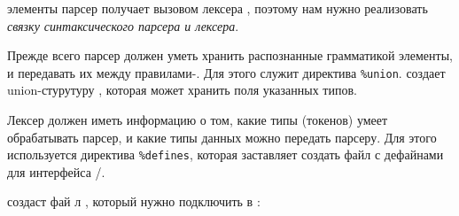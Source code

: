 
 элементы парсер получает вызовом лексера ,
поэтому нам нужно реализовать \emph{связку синтаксического парсера и лексера}.

Прежде всего парсер должен уметь хранить распознанные грамматикой элементы, и
передавать их между правилами-. Для этого служит директива
\verb|%union|.  создает union-стурутуру , которая
может хранить поля указанных типов.

Лексер должен иметь информацию о том, какие типы  (токенов)
умеет обрабатывать парсер, и какие типы данных можно передать парсеру. Для
этого используется директива \verb|%defines|, которая заставляет 
создать файл  с дефайнами для интерфейса
/.


 создаст фай	л , который нужно подключить в
:

